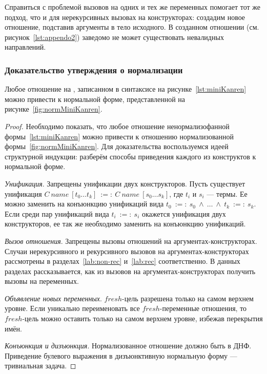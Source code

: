 Справиться с проблемой вызовов на одних и тех же переменных помогает тот же подход, что и для нерекурсивных вызовах на конструкторах: создадим новое отношение, подставив аргументы в тело исходного.
В созданном отношении (см. рисунок~\ref{lst:appendo2}) заведомо не может существовать невалидных направлений.


\subsubsection{Доказательство утверждения о нормализации}
\label{lab:normProof}

\begin{theorem}
    Любое отношение на \miniKanren{}, записанном в синтаксисе на рисунке~\ref{lst:miniKanren} можно привести к нормальной форме, представленной на рисунке~\ref{fig:normMiniKanren}.
\end{theorem}

\begin{proof}
    Необходимо показать, что любое отношение ненормализофанной формы~\ref{lst:miniKanren} можно привести к отношению нормализованной формы~\ref{fig:normMiniKanren}.
    Для доказательства воспользуемся идеей структурной индукции: разберём способы приведения каждого из конструктов к нормальной форме.
    
    \textit{Унификация}.
    Запрещены унификации двух конструкторов.
    Пусть существует унификация $C~name~[t_0 \dots t_k]~:=:~C~name~[s_0 \dots s_k]$, где $t_i$ и $s_i$ --- термы.
    Ее можно заменить на конъюнкцию унификаций вида $t_0~:=:~s_0~\wedge~\dots~\wedge~t_k~:=:~s_k$.
    Если среди пар унификаций вида $t_i~:=:~s_i$ окажется унификация двух конструкторов, ее так же необходимо заменить на конъюнкцию унификаций.
    
    \textit{Вызов отношения}.
    Запрещены вызовы отношений на аргументах-конструкторах.
    Случаи нерекурсивного и рекурсивного вызовов на аргументах-конструкторах рассмотрены в разделах~\ref{lab:non-rec} и~\ref{lab:rec} соответственно.
    В данных разделах рассказывается, как из вызовов на аргументах-конструкторах получить вызовы на переменных.
    
    \textit{Объявление новых переменных}.
    $fresh$-цель разрешена только на самом верхнем уровне.
    Если уникально переименовать все $fresh$-переменные отношения, то $fresh$-цель можно оставить только на самом верхнем уровне, избежав перекрытия имён.
    
    \textit{Конъюнкция и дизъюнкция}.
    Нормализованное отношение должно быть в ДНФ.
    Приведение булевого выражения в дизъюнктивную нормальную форму --- тривиальная задача.
\end{proof}
